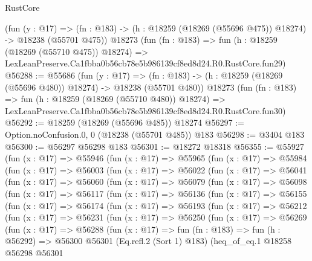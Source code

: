 \begin{lexlean}{RustCore}
\begin{coremodule}
    (fun (y : @17) =>
    (fn : @183) -> (h : @18259 (@18269 (@55696 @475)) @18274) -> @18238 (@55701 @475))
    @18273
    (fun (fn : @183) =>
    fun (h : @18259 (@18269 (@55710 @475)) @18274) =>
    LexLeanPreserve.Ca1fbba0b56cb78e5b986139cf8ed8d24.R0.RustCore.fun29)
@56288 := @55686
    (fun (y : @17) =>
    (fn : @183) -> (h : @18259 (@18269 (@55696 @480)) @18274) -> @18238 (@55701 @480))
    @18273
    (fun (fn : @183) =>
    fun (h : @18259 (@18269 (@55710 @480)) @18274) =>
    LexLeanPreserve.Ca1fbba0b56cb78e5b986139cf8ed8d24.R0.RustCore.fun30)
@56292 := @18259 (@18269 (@55696 @485)) @18274
@56297 := Option.noConfusion.{0, 0} (@18238 (@55701 @485)) @183
@56298 := @3404 @183
@56300 := @56297 @56298 @183
@56301 := @18272 @18318
@56355 := @55927
    (fun (x : @17) =>
    @55946
      (fun (x : @17) =>
      @55965
        (fun (x : @17) =>
        @55984
          (fun (x : @17) =>
          @56003
            (fun (x : @17) =>
            @56022
              (fun (x : @17) =>
              @56041
                (fun (x : @17) =>
                @56060
                  (fun (x : @17) =>
                  @56079
                    (fun (x : @17) =>
                    @56098
                      (fun (x : @17) =>
                      @56117
                        (fun (x : @17) =>
                        @56136
                          (fun (x : @17) =>
                          @56155
                            (fun (x : @17) =>
                            @56174
                              (fun (x : @17) =>
                              @56193
                                (fun (x : @17) =>
                                @56212
                                  (fun (x : @17) =>
                                  @56231
                                    (fun (x : @17) =>
                                    @56250
                                      (fun (x : @17) =>
                                      @56269
                                        (fun (x : @17) =>
                                        @56288
                                          (fun (x : @17) =>
                                          fun (fn : @183) =>
                                          fun (h : @56292) =>
                                          @56300
                                            @56301
                                            (Eq.refl.{2} (Sort 1) @183)
                                            (heq_of_eq.{1}
                                              @18258
                                              @56298
                                              @56301

\end{coremodule}
\end{lexlean}
